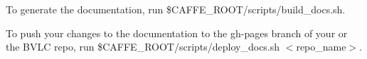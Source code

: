 To generate the documentation, run {\ttfamily \$\+C\+A\+F\+F\+E\+\_\+\+R\+O\+OT/scripts/build\+\_\+docs.sh}.

To push your changes to the documentation to the gh-\/pages branch of your or the B\+V\+LC repo, run {\ttfamily \$\+C\+A\+F\+F\+E\+\_\+\+R\+O\+OT/scripts/deploy\+\_\+docs.sh $<$repo\+\_\+name$>$}. 